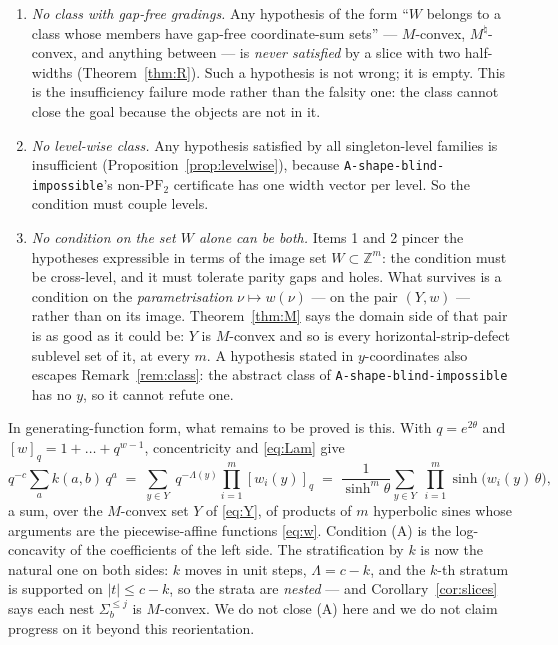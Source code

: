 \documentclass[11pt]{article}
\theoremstyle{plain}
\theoremstyle{definition}
\newcommand{\PFtwo}{\mathrm{PF}_2}
\newcommand{\Z}{\mathbb{Z}}
\begin{document}
\begin{enumerate}
\item \emph{No class with gap-free gradings.} Any hypothesis of the form ``$W$ belongs to
a class whose members have gap-free coordinate-sum sets'' --- $M$-convex, $M^\natural$-convex,
and anything between --- is \emph{never satisfied} by a slice with two half-widths
(Theorem~\ref{thm:R}). Such a hypothesis is not wrong; it is empty. This is the
insufficiency failure mode rather than the falsity one: the class cannot close the goal
because the objects are not in it.
\item \emph{No level-wise class.} Any hypothesis satisfied by all singleton-level families
is insufficient (Proposition~\ref{prop:levelwise}), because
\texttt{A-shape-blind-impossible}'s non-$\PFtwo$ certificate has one width vector per
level. So the condition must couple levels.
\item \emph{No condition on the set $W$ alone can be both.} Items 1 and 2 pincer the
hypotheses expressible in terms of the image set $W\subset\Z^m$: the condition must be
cross-level, and it must tolerate parity gaps and holes. What survives is a condition on
the \emph{parametrisation} $\nu\mapsto w(\nu)$ --- on the pair $(Y,w)$ --- rather than on
its image. Theorem~\ref{thm:M} says the domain side of that pair is as good as it could be:
$Y$ is $M$-convex and so is every horizontal-strip-defect sublevel set of it, at every $m$.
A hypothesis stated in $y$-coordinates also escapes Remark~\ref{rem:class}: the abstract
class of \texttt{A-shape-blind-impossible} has no $y$, so it cannot refute one.
\end{enumerate}

In generating-function form, what remains to be proved is this. With $q=e^{2\theta}$ and
$[w]_q=1+\dots+q^{w-1}$, concentricity and \eqref{eq:Lam} give
\[
  q^{-c}\sum_{a}k(a,b)\,q^{a}
  \;=\;\sum_{y\in Y}\;q^{-\Lambda(y)}\prod_{i=1}^m [w_i(y)]_q
  \;=\;\frac{1}{\sinh^m\theta}\sum_{y\in Y}\;\prod_{i=1}^m\sinh\bigl(w_i(y)\,\theta\bigr),
\]
a sum, over the $M$-convex set $Y$ of \eqref{eq:Y}, of products of $m$ hyperbolic sines
whose arguments are the piecewise-affine functions \eqref{eq:w}. Condition (A) is the
log-concavity of the coefficients of the left side. The stratification by $k$ is now the
natural one on both sides: $k$ moves in unit steps, $\Lambda=c-k$, and the $k$-th stratum
is supported on $|t|\le c-k$, so the strata are \emph{nested} --- and
Corollary~\ref{cor:slices} says each nest $\Sigma_b^{\le j}$ is $M$-convex. We do not
close (A) here and we do not claim progress on it beyond this reorientation.
\end{document}
